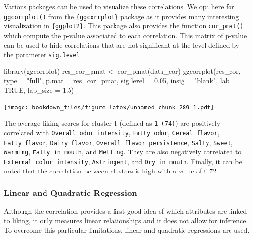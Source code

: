 \documentclass[
]{krantz}
\makeatletter
\newenvironment{Shaded}{\begin{snugshade}}{\end{snugshade}}
\newcommand{\AttributeTok}[1]{\textcolor[rgb]{0.61,0.61,0.61}{#1}}
\newcommand{\ConstantTok}[1]{\textcolor[rgb]{0,0,0}{#1}}
\newcommand{\FloatTok}[1]{\textcolor[rgb]{0.06,0.06,0.06}{#1}}
\newcommand{\FunctionTok}[1]{\textcolor[rgb]{0,0,0}{#1}}
\newcommand{\NormalTok}[1]{#1}
\newcommand{\OtherTok}[1]{\textcolor[rgb]{0.37,0.37,0.37}{#1}}
\newcommand{\StringTok}[1]{\textcolor[rgb]{0.5,0.5,0.5}{#1}}
\newenvironment{kframe}{%
\medskip{}
\setlength{\fboxsep}{.8em}
 \def\at@end@of@kframe{}%
 \ifinner\ifhmode%
  \def\at@end@of@kframe{\end{minipage}}%
  \begin{minipage}{\columnwidth}%
 \fi\fi%
 \def\FrameCommand##1{\hskip\@totalleftmargin \hskip-\fboxsep
 \colorbox{shadecolor}{##1}\hskip-\fboxsep
     \hskip-\linewidth \hskip-\@totalleftmargin \hskip\columnwidth}%
 \MakeFramed {\advance\hsize-\width
   \@totalleftmargin\z@ \linewidth\hsize
   \@setminipage}}%
 {\par\unskip\endMakeFramed%
 \at@end@of@kframe}
\renewenvironment{Shaded}{\begin{kframe}}{\end{kframe}}
\makeatother
\begin{document}
Various packages can be used to visualize these correlations. We opt here for \texttt{ggcorrplot()} from the \texttt{\{ggcorrplot\}} package as it provides many interesting visualization in \texttt{\{ggplot2\}}. This package also provides the function \texttt{cor\_pmat()} which compute the p-value associated to each correlation. This matrix of p-value can be used to hide correlations that are not significant at the level defined by the parameter \texttt{sig.level}.

\begin{Shaded}
\begin{Highlighting}[]
\FunctionTok{library}\NormalTok{(ggcorrplot)}
\NormalTok{res\_cor\_pmat }\OtherTok{\textless{}{-}} \FunctionTok{cor\_pmat}\NormalTok{(data\_cor)}
\FunctionTok{ggcorrplot}\NormalTok{(res\_cor, }\AttributeTok{type =} \StringTok{"full"}\NormalTok{, }\AttributeTok{p.mat =}\NormalTok{ res\_cor\_pmat, }
           \AttributeTok{sig.level =} \FloatTok{0.05}\NormalTok{, }\AttributeTok{insig =} \StringTok{"blank"}\NormalTok{, }
           \AttributeTok{lab =} \ConstantTok{TRUE}\NormalTok{, }\AttributeTok{lab\_size =} \FloatTok{1.5}\NormalTok{)}
\end{Highlighting}
\end{Shaded}

\texttt{[image: bookdown\_files/figure-latex/unnamed-chunk-289-1.pdf]}

The average liking scores for cluster 1 (defined as \texttt{1\ (74)}) are positively correlated with \texttt{Overall\ odor\ intensity}, \texttt{Fatty\ odor}, \texttt{Cereal\ flavor}, \texttt{Fatty\ flavor}, \texttt{Dairy\ flavor}, \texttt{Overall\ flavor\ persistence}, \texttt{Salty}, \texttt{Sweet}, \texttt{Warming}, \texttt{Fatty\ in\ mouth}, and \texttt{Melting}. They are also negatively correlated to \texttt{External\ color\ intensity}, \texttt{Astringent}, and \texttt{Dry\ in\ mouth}.
Finally, it can be noted that the correlation between clusters is high with a value of 0.72.

\hypertarget{linear-and-quadratic-regression}{%
\subsubsection{Linear and Quadratic Regression}\label{linear-and-quadratic-regression}}

Although the correlation provides a first good idea of which attributes are linked to liking, it only measures linear relationships and it does not allow for inference. To overcome this particular limitations, linear and quadratic regressions are used.
\end{document}
